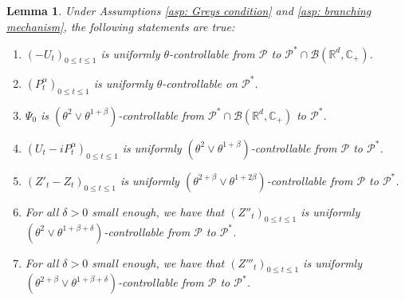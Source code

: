 \documentclass[12pt,a4paper]{amsart}
\theoremstyle{plain}
\newtheorem{lem}[thm]{Lemma}
\theoremstyle{definition}
\numberwithin{equation}{section}
\begin{document}
\begin{lem}
  \label{lem: upper bound for usgx}
  Under Assumptions \ref{asp: Greys condition} and \ref{asp: branching mechanism}, the following statements are true:
  \begin{enumerate}
  \item
    $(-U_t)_{0\leq t\leq 1}$ is uniformly $\theta$-controllable from $\mathcal P$ to $\mathcal P^*\cap \mathcal B(\mathbb R^d, \mathbb C_+)$.
  \item
    $(P^\alpha_t)_{0\leq t\leq 1}$ is uniformly $\theta$-controllable on $\mathcal P^*$.
  \item
    $\Psi_0$ is $(\theta^2\vee \theta^{1+\beta})$-controllable from $\mathcal P^* \cap \mathcal B(\mathbb R^d, \mathbb C_+)$ to $\mathcal P^*$.
  \item
    $(U_t- iP_t^{\alpha})_{0\leq t\leq 1}$ is uniformly $(\theta^2\vee \theta^{1+\beta})$-controllable from $\mathcal P$ to $\mathcal P^*$.
  \item
    $(Z'_t-Z_t)_{0\leq t\leq 1}$ is uniformly $(\theta^{2+\beta}\vee \theta^{1+2\beta})$-controllable from $\mathcal P$ to $\mathcal P^*$.
  \item
    For all $\delta > 0$ small enough, we have that $(Z''_t)_{0\leq t\leq 1}$ is uniformly $(\theta^2\vee \theta^{1+\beta+\delta})$-controllable from $\mathcal P$ to $\mathcal P^*$.
  \item
    For all $\delta > 0$ small enough, we have that $(Z'''_t)_{0\leq t\leq 1}$ is uniformly $(\theta^{2+\beta}\vee \theta^{1+\beta+\delta})$-controllable from $\mathcal P$ to $\mathcal P^*$.
  \end{enumerate}
\end{lem}
\end{document}
